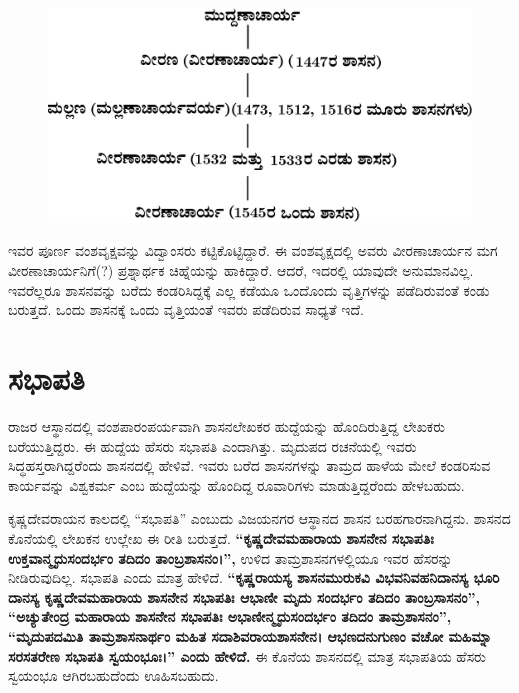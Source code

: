 \begin{figure}[!h]
\includegraphics{images/chap5/chap5fig5.jpeg}
\end{figure}

ಇವರ ಪೂರ್ಣ ವಂಶವೃಕ್ಷವನ್ನು ವಿದ್ವಾಂಸರು ಕಟ್ಟಿಕೊಟ್ಟಿದ್ದಾರೆ. ಈ ವಂಶವೃಕ್ಷದಲ್ಲಿ ಅವರು ವೀರಣಾಚಾರ್ಯನ ಮಗ ವೀರಣಾಚಾರ್ಯನಿಗೆ(?) ಪ್ರಶ್ನಾರ್ಥಕ ಚಿಹ್ನೆಯನ್ನು ಹಾಕಿದ್ದಾರೆ. ಆದರೆ, ಇದರಲ್ಲಿ ಯಾವುದೇ ಅನುಮಾನವಿಲ್ಲ. ಇವರೆಲ್ಲರೂ ಶಾಸನವನ್ನು ಬರೆದು ಕಂಡರಿಸಿದ್ದಕ್ಕೆ ಎಲ್ಲ ಕಡೆಯೂ ಒಂದೊಂದು ವೃತ್ತಿಗಳನ್ನು ಪಡೆದಿರುವಂತೆ ಕಂಡು ಬರುತ್ತದೆ. ಒಂದು ಶಾಸನಕ್ಕೆ ಒಂದು ವೃತ್ತಿಯಂತೆ ಇವರು ಪಡೆದಿರುವ ಸಾಧ್ಯತೆ ಇದೆ.


\section{ಸಭಾಪತಿ}

ರಾಜರ ಆಸ್ಥಾನದಲ್ಲಿ ವಂಶಪಾರಂಪರ್ಯವಾಗಿ ಶಾಸನಲೇಖಕರ ಹುದ್ದೆಯನ್ನು ಹೊಂದಿರುತ್ತಿದ್ದ ಲೇಖಕರು ಬರೆಯುತ್ತಿದ್ದರು. ಈ ಹುದ್ದೆಯ ಹೆಸರು ಸಭಾಪತಿ ಎಂದಾಗಿತ್ತು. ಮೃದುಪದ ರಚನೆಯಲ್ಲಿ ಇವರು ಸಿದ್ಧಹಸ್ತರಾಗಿದ್ದರೆಂದು ಶಾಸನದಲ್ಲಿ ಹೇಳಿವೆ. ಇವರು ಬರೆದ ಶಾಸನಗಳನ್ನು ತಾಮ್ರದ ಹಾಳೆಯ ಮೇಲೆ ಕಂಡರಿಸುವ ಕಾರ್ಯವನ್ನು ವಿಶ್ವಕರ್ಮ ಎಂಬ ಹುದ್ದೆಯನ್ನು ಹೊಂದಿದ್ದ ರೂವಾರಿಗಳು ಮಾಡುತ್ತಿದ್ದರೆಂದು ಹೇಳಬಹುದು.

ಕೃಷ್ಣದೇವರಾಯನ ಕಾಲದಲ್ಲಿ “ಸಭಾಪತಿ” ಎಂಬುದು ವಿಜಯನಗರ ಆಸ್ಥಾನದ ಶಾಸನ ಬರಹಗಾರನಾಗಿದ್ದನು. ಶಾಸನದ ಕೊನೆಯಲ್ಲಿ ಲೇಖಕನ ಉಲ್ಲೇಖ ಈ ರೀತಿ ಬರುತ್ತದೆ. \textbf{“ಕೃಷ್ಣದೇವಮಹಾರಾಯ ಶಾಸನೇನ ಸಭಾಪತಿಃ ಉಕ್ತವಾನ್ಮೃದುಸಂದರ್ಭಂ ತದಿದಂ ತಾಂಬ್ರಶಾಸನಂ।”,} ಉಳಿದ ತಾಮ್ರಶಾಸನಗಳಲ್ಲಿಯೂ ಇವರ ಹೆಸರನ್ನು ನೀಡಿರುವುದಿಲ್ಲ. ಸಭಾಪತಿ ಎಂದು ಮಾತ್ರ ಹೇಳಿದೆ. \textbf{“ಕೃಷ್ಣರಾಯಸ್ಯ ಶಾಸನಮುರುಕವಿ ವಿಭವನಿವಹನಿದಾನಸ್ಯ ಭೂರಿ ದಾನಸ್ಯ ಕೃಷ್ಣದೇವಮಹಾರಾಯ ಶಾಸನೇನ ಸಭಾಪತಿಃ ಆಭಾಣೀ ಮೃದು ಸಂದರ್ಭಂ ತದಿದಂ ತಾಂಬ್ರಸಾಸನಂ”, “ಅಚ್ಯುತೇಂದ್ರ ಮಹಾರಾಯ ಶಾಸನೇನ ಸಭಾಪತಿಃ ಅಭಾಣೀನ್ಮೃದುಸಂದರ್ಭಂ ತದಿದಂ ತಾಮ್ರಶಾಸನಂ”, “ಮೃದುಪದಮಿತಿ ತಾಮ್ರಶಾಸನಾರ್ಥಂ ಮಹಿತ ಸದಾಶಿವ\-ರಾಯಶಾಸನೇನ। ಆಭಣದನುಗುಣಂ ವಚೋ ಮಹಿಮ್ನಾ ಸರಸತರೇಣ ಸಭಾಪತಿ ಸ್ವಯಂಭೂಃ।” ಎಂದು ಹೇಳಿದೆ. }ಈ ಕೊನೆಯ ಶಾಸನದಲ್ಲಿ ಮಾತ್ರ ಸಭಾಪತಿಯ ಹೆಸರು ಸ್ವಯಂಭೂ ಆಗಿರಬಹುದೆಂದು ಊಹಿಸಬಹುದು.


